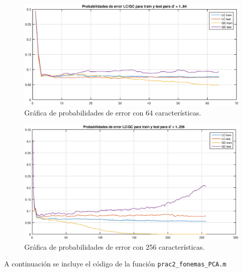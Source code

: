 \documentclass[11pt]{article} %
\begin{document}
\begin{figure}[h]
	\centering
	\includegraphics[width=0.9 \textwidth]{../PCA/LC_QC_train_test_64.eps}
	\caption[]{\small Gráfica de probabilidades de error con 64 características.}
	\label{fig:pca:64}
\end{figure}

\begin{figure}[h]
	\centering
	\includegraphics[width=0.9 \textwidth]{../PCA/LC_QC_train_test_256.eps}
	\caption[]{\small Gráfica de probabilidades de error con 256 características.}
	\label{fig:pca:256}
\end{figure}

A continuación se incluye el código de la función \texttt{prac2\_fonemas\_PCA.m}

\clearpage


\end{document}
